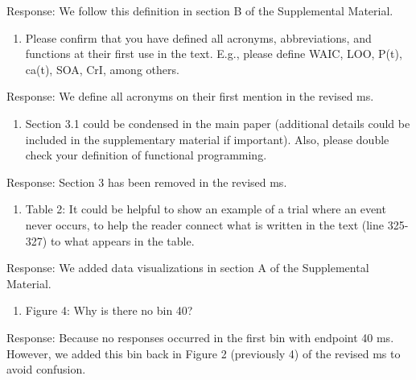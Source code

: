 \documentclass[
]{article}
\providecommand{\tightlist}{%
  \setlength{\itemsep}{0pt}\setlength{\parskip}{0pt}}
\renewenvironment{quote}{\begin{leftbar}}{\end{leftbar}}
\begin{document}
Response: We follow this definition in section B of the Supplemental
Material.

\begin{quote}
\begin{enumerate}
\def\labelenumi{\arabic{enumi}.}
\setcounter{enumi}{5}
\tightlist
\item
  Please confirm that you have defined all acronyms, abbreviations, and
  functions at their first use in the text. E.g., please define WAIC,
  LOO, P(t), ca(t), SOA, CrI, among others.
\end{enumerate}
\end{quote}

Response: We define all acronyms on their first mention in the revised
ms.

\begin{quote}
\begin{enumerate}
\def\labelenumi{\arabic{enumi}.}
\setcounter{enumi}{6}
\tightlist
\item
  Section 3.1 could be condensed in the main paper (additional details
  could be included in the supplementary material if important). Also,
  please double check your definition of functional programming.
\end{enumerate}
\end{quote}

Response: Section 3 has been removed in the revised ms.

\begin{quote}
\begin{enumerate}
\def\labelenumi{\arabic{enumi}.}
\setcounter{enumi}{7}
\tightlist
\item
  Table 2: It could be helpful to show an example of a trial where an
  event never occurs, to help the reader connect what is written in the
  text (line 325-327) to what appears in the table.
\end{enumerate}
\end{quote}

Response: We added data visualizations in section A of the Supplemental
Material.

\begin{quote}
\begin{enumerate}
\def\labelenumi{\arabic{enumi}.}
\setcounter{enumi}{8}
\tightlist
\item
  Figure 4: Why is there no bin 40?
\end{enumerate}
\end{quote}

Response: Because no responses occurred in the first bin with endpoint
40 ms. However, we added this bin back in Figure 2 (previously 4) of the
revised ms to avoid confusion.
\end{document}
